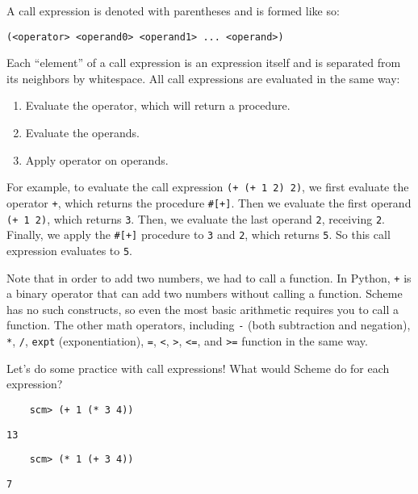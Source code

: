A call expression is denoted with parentheses and is formed like so:
\vspace{0.5mm}
\begin{lstlisting}
(<operator> <operand0> <operand1> ... <operand>)
\end{lstlisting}
Each ``element'' of a call expression is an expression itself and is separated from its
neighbors by whitespace. All call expressions are evaluated in the same way:
\begin{enumerate}
\item Evaluate the operator, which will return a procedure.
\item Evaluate the operands.
\item Apply operator on operands.
\end{enumerate}
For example, to evaluate the call expression \lstinline{(+ (+ 1 2) 2)}, we first evaluate the operator \lstinline{+}, which returns the procedure \lstinline{#[+]}. Then we evaluate the first operand \lstinline{(+ 1 2)}, which returns \lstinline{3}. Then, we evaluate the last operand \lstinline{2}, receiving \lstinline{2}. Finally, we apply the \lstinline{#[+]} procedure to \lstinline{3} and \lstinline{2}, which returns \lstinline{5}. So this call expression evaluates to \lstinline{5}. 

Note that in order to add two numbers, we had to call a function. In Python, \lstinline{+} is a binary operator that can add two numbers without calling a function. Scheme has no such constructs, so even the most basic arithmetic requires you to call a function. The other math operators, including \lstinline{-} (both subtraction and negation), \lstinline{*}, \lstinline{/}, \lstinline{expt} (exponentiation), \lstinline{=}, \lstinline{<}, \lstinline{>}, \lstinline{<=}, and \lstinline{>=} function in the same way. 

\question Let's do some practice with call expressions! What would Scheme do for each expression?

\begin{lstlisting}
    scm> (+ 1 (* 3 4))
\end{lstlisting}
\begin{solution}[.25in]
    \texttt{13}
\end{solution}

\begin{lstlisting}
    scm> (* 1 (+ 3 4))
\end{lstlisting}
\begin{solution}[.25in]
    \texttt{7}
\end{solution}

